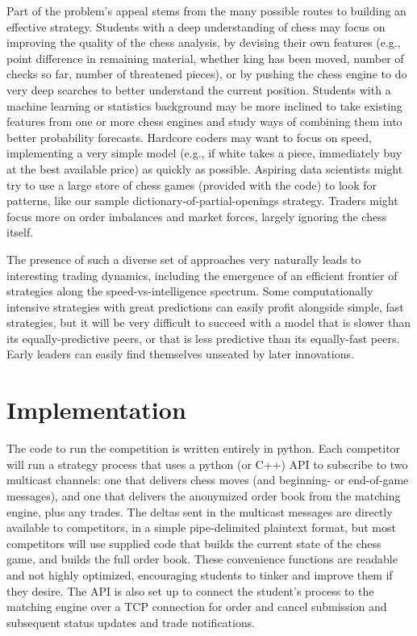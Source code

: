 \documentclass{article}
\begin{document}
Part of the problem's appeal stems from the many possible routes to building an effective
strategy. Students with a deep understanding of chess may focus on improving the quality of the
chess analysis, by devising their own features (e.g., point difference in remaining material,
whether king has been moved, number of checks so far, number of threatened pieces), or by pushing
the chess engine to do very deep searches to better understand the current position. Students with a
machine learning or statistics background may be more inclined to take existing features from one or
more chess engines and study ways of combining them into better probability forecasts. Hardcore
coders may want to focus on speed, implementing a very simple model (e.g., if white takes a piece,
immediately buy at the best available price) as quickly as possible. Aspiring data scientists might
try to use a large store of chess games (provided with the code) to look for patterns, like our
sample dictionary-of-partial-openings strategy. Traders might focus more on order imbalances and
market forces, largely ignoring the chess itself.

The presence of such a diverse set of approaches very naturally leads to interesting trading
dynamics, including the emergence of an efficient frontier of strategies along the
speed-vs-intelligence spectrum. Some computationally intensive strategies with great predictions
can easily profit alongside simple, fast strategies, but it will be very difficult to succeed with a
model that is slower than its equally-predictive peers, or that is less predictive than its
equally-fast peers. Early leaders can easily find themselves unseated by later innovations.

\section{Implementation}

The code to run the competition is written entirely in python. Each competitor will run a strategy
process that uses a python (or C++) API to subscribe to two multicast channels: one that delivers
chess moves (and beginning- or end-of-game messages), and one that delivers the anonymized order
book from the matching engine, plus any trades. The deltas sent in the multicast messages are
directly available to competitors, in a simple pipe-delimited plaintext format, but most competitors
will use supplied code that builds the current state of the chess game, and builds the full order
book. These convenience functions are readable and not highly optimized, encouraging students to
tinker and improve them if they desire. The API is also set up to connect the student's process to
the matching engine over a TCP connection for order and cancel submission and subsequent status
updates and trade notifications.
\end{document}
